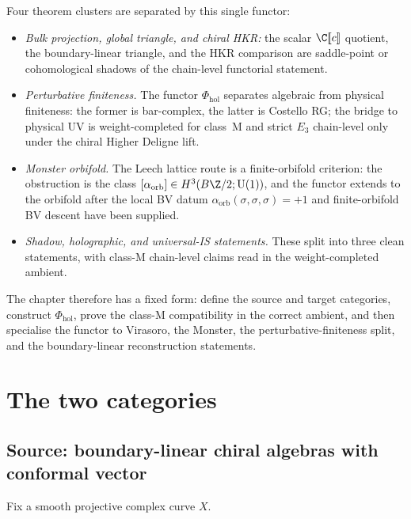 Four theorem clusters are separated by this single functor:
\begin{itemize}[leftmargin=1.3em]
\item \emph{Bulk projection, global triangle, and chiral HKR:} the
 scalar $\C[\![c]\!]$ quotient, the boundary-linear triangle, and
 the HKR comparison are saddle-point or cohomological shadows of the
 chain-level functorial statement.
\item \emph{Perturbative finiteness.} The functor $\Phi_{\mathrm{hol}}$
 separates algebraic from physical finiteness: the former is
 bar-complex, the latter is Costello RG; the bridge to physical UV is
 weight-completed for class~M and strict $E_3$ chain-level only under
 the chiral Higher Deligne lift.
\item \emph{Monster orbifold.} The Leech lattice route is a
finite-orbifold criterion: the obstruction is the class
$[\alpha_{\mathrm{orb}}]\in H^3(B\Z/2;\mathrm{U}(1))$, and the
functor extends to the orbifold after the local BV datum
$\alpha_{\mathrm{orb}}(\sigma,\sigma,\sigma)=+1$ and
finite-orbifold BV descent have been supplied.
\item \emph{Shadow, holographic, and universal-IS statements.} These
 split into three clean statements, with class-M chain-level claims
 read in the weight-completed ambient.
\end{itemize}

The chapter therefore has a fixed form: define the source and target
categories, construct $\Phi_{\mathrm{hol}}$, prove the class-M
compatibility in the correct ambient, and then specialise the functor
to Virasoro, the Monster, the perturbative-finiteness split, and the
boundary-linear reconstruction statements.

\section{The two categories}
\label{sec:uhf-setup}

\subsection{Source: boundary-linear chiral algebras with conformal vector}

Fix a smooth projective complex curve $X$.

